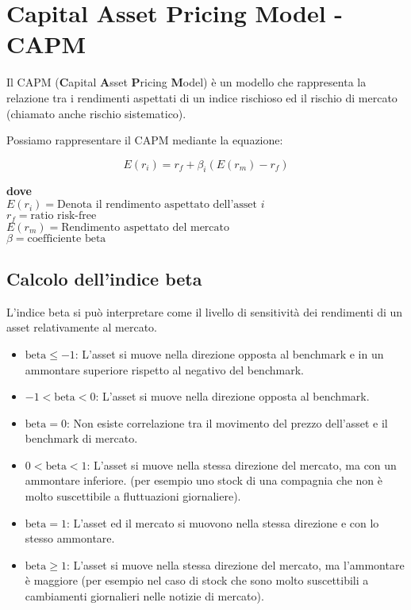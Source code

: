 \section{Capital Asset Pricing Model - CAPM}

Il CAPM (\textbf{C}apital \textbf{A}sset \textbf{P}ricing \textbf{M}odel) è un modello che rappresenta la relazione tra 
i rendimenti aspettati di un indice rischioso ed il rischio di mercato (chiamato anche rischio sistematico).

Possiamo rappresentare il CAPM mediante la equazione:

\begin{displaymath}
    E(r_i) = r_f + \beta_i (E(r_m) - r_f)
\end{displaymath}

\textbf{dove}\\
\(E(r_i) = \text{Denota il rendimento aspettato dell'asset } i\)\\
\(r_f = \text{ratio risk-free}\)\\
\(E(r_m) = \text{Rendimento aspettato del mercato}\)\\
\(\beta = \text{coefficiente beta}\)

\subsection{Calcolo dell'indice beta}

L'indice beta si può interpretare come il livello di sensitività dei rendimenti di un asset relativamente al mercato.

\begin{itemize}
    \item \(\text{beta} \le -1\): L'asset si muove nella direzione opposta al benchmark e in un ammontare superiore rispetto al negativo del benchmark.
    \item \(-1 < \text{beta} < 0\): L'asset si muove nella direzione opposta al benchmark.
    \item \(\text{beta} = 0\): Non esiste correlazione tra il movimento del prezzo dell'asset e il benchmark di mercato.
    \item \(0 < \text{beta} < 1\): L'asset si muove nella stessa direzione del mercato, ma con un ammontare inferiore. (per esempio uno stock di una compagnia che non è molto suscettibile a fluttuazioni giornaliere).
    \item \(\text{beta} = 1\): L'asset ed il mercato si muovono nella stessa direzione e con lo stesso ammontare.
    \item \(\text{beta} \ge 1\): L'asset si muove nella stessa direzione del mercato, ma l'ammontare è maggiore (per esempio nel caso di stock che sono molto suscettibili a cambiamenti giornalieri nelle notizie di mercato). 
\end{itemize}

